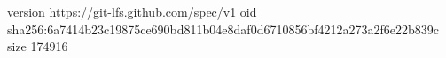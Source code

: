 version https://git-lfs.github.com/spec/v1
oid sha256:6a7414b23c19875ce690bd811b04e8daf0d6710856bf4212a273a2f6e22b839c
size 174916

